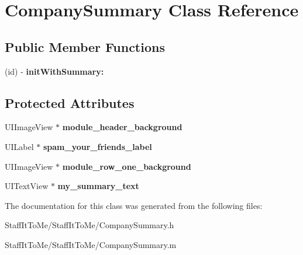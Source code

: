 \hypertarget{interface_company_summary}{
\section{\-Company\-Summary \-Class \-Reference}
\label{interface_company_summary}
}
\subsection*{\-Public \-Member \-Functions}
\begin{DoxyCompactItemize}
\item 
\hypertarget{interface_company_summary_a0af6af5854655d97a5c5201ae1447db6}{
(id) -\/ {\bfseries init\-With\-Summary\-:}}
\label{interface_company_summary_a0af6af5854655d97a5c5201ae1447db6}

\end{DoxyCompactItemize}
\subsection*{\-Protected \-Attributes}
\begin{DoxyCompactItemize}
\item 
\hypertarget{interface_company_summary_a66b931f212fec07390a7a3510aa4765b}{
\-U\-I\-Image\-View $\ast$ {\bfseries module\-\_\-header\-\_\-background}}
\label{interface_company_summary_a66b931f212fec07390a7a3510aa4765b}

\item 
\hypertarget{interface_company_summary_a7522f575de4cb005faf290ad6473b695}{
\-U\-I\-Label $\ast$ {\bfseries spam\-\_\-your\-\_\-friends\-\_\-label}}
\label{interface_company_summary_a7522f575de4cb005faf290ad6473b695}

\item 
\hypertarget{interface_company_summary_a82c4be0cd325448933e0827665fc6294}{
\-U\-I\-Image\-View $\ast$ {\bfseries module\-\_\-row\-\_\-one\-\_\-background}}
\label{interface_company_summary_a82c4be0cd325448933e0827665fc6294}

\item 
\hypertarget{interface_company_summary_a7f8bf45e03c302d3ec51349adaa638bb}{
\-U\-I\-Text\-View $\ast$ {\bfseries my\-\_\-summary\-\_\-text}}
\label{interface_company_summary_a7f8bf45e03c302d3ec51349adaa638bb}

\end{DoxyCompactItemize}


\-The documentation for this class was generated from the following files\-:\begin{DoxyCompactItemize}
\item 
\-Staff\-It\-To\-Me/\-Staff\-It\-To\-Me/\-Company\-Summary.\-h\item 
\-Staff\-It\-To\-Me/\-Staff\-It\-To\-Me/\-Company\-Summary.\-m\end{DoxyCompactItemize}
